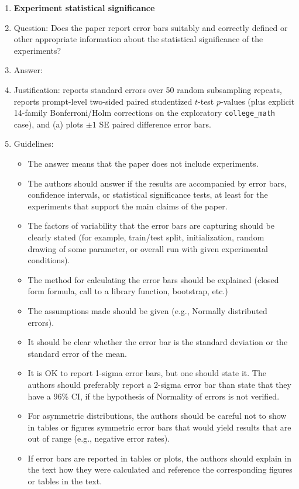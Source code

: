 \documentclass{article}
\theoremstyle{plain}
\theoremstyle{definition}
\theoremstyle{remark}
\begin{document}
\begin{enumerate}
\item {\bf Experiment statistical significance}
    \item[] Question: Does the paper report error bars suitably and correctly defined or other appropriate information about the statistical significance of the experiments?
    \item[] Answer: \answerYes{}
    \item[] Justification:  reports standard errors over 50 random subsampling repeats,  reports prompt-level two-sided paired studentized $t$-test $p$-values (plus explicit 14-family Bonferroni/Holm corrections on the exploratory \texttt{college\_math} case), and (a) plots $\pm 1$ SE paired difference error bars.
    \item[] Guidelines:
    \begin{itemize}
        \item The answer \answerNA{} means that the paper does not include experiments.
        \item The authors should answer \answerYes{} if the results are accompanied by error bars, confidence intervals, or statistical significance tests, at least for the experiments that support the main claims of the paper.
        \item The factors of variability that the error bars are capturing should be clearly stated (for example, train/test split, initialization, random drawing of some parameter, or overall run with given experimental conditions).
        \item The method for calculating the error bars should be explained (closed form formula, call to a library function, bootstrap, etc.)
        \item The assumptions made should be given (e.g., Normally distributed errors).
        \item It should be clear whether the error bar is the standard deviation or the standard error of the mean.
        \item It is OK to report 1-sigma error bars, but one should state it. The authors should preferably report a 2-sigma error bar than state that they have a 96\% CI, if the hypothesis of Normality of errors is not verified.
        \item For asymmetric distributions, the authors should be careful not to show in tables or figures symmetric error bars that would yield results that are out of range (e.g., negative error rates).
        \item If error bars are reported in tables or plots, the authors should explain in the text how they were calculated and reference the corresponding figures or tables in the text.
    \end{itemize}


\end{enumerate}
\end{document}
